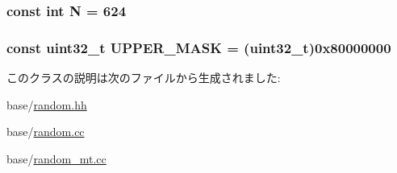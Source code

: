\label{classRandom_a0893639c022032e006e5b13378f7b4b2}
\hypertarget{classRandom_ab2b6b0c222cd1ce70d6a831f57241e59}{
\subsubsection[{N}]{\setlength{\rightskip}{0pt plus 5cm}const int {\bf N} = 624}}
\label{classRandom_ab2b6b0c222cd1ce70d6a831f57241e59}
\hypertarget{classRandom_af886d2b26feab424eef23b7b26896ecc}{
\subsubsection[{UPPER\_\-MASK}]{\setlength{\rightskip}{0pt plus 5cm}const {\bf uint32\_\-t} {\bf UPPER\_\-MASK} = ({\bf uint32\_\-t})0x80000000}}
\label{classRandom_af886d2b26feab424eef23b7b26896ecc}


このクラスの説明は次のファイルから生成されました:\begin{DoxyCompactItemize}
\item 
base/\hyperlink{random_8hh}{random.hh}\item 
base/\hyperlink{random_8cc}{random.cc}\item 
base/\hyperlink{random__mt_8cc}{random\_\-mt.cc}\end{DoxyCompactItemize}

